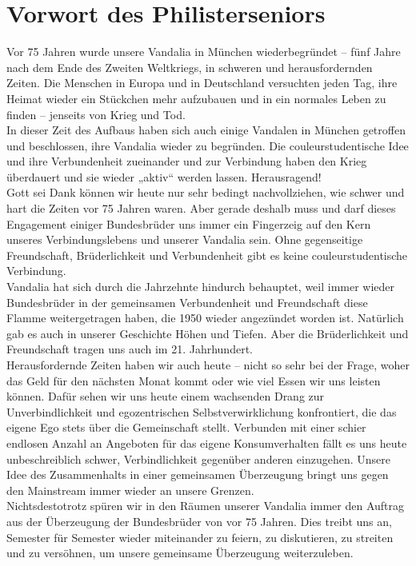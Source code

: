 \section{Vorwort des Philisterseniors}


\begin{multicols}{2}

Vor 75 Jahren wurde unsere Vandalia in München
wiederbegründet – fünf Jahre nach dem Ende des Zweiten Weltkriegs, in schweren
und herausfordernden Zeiten. Die Menschen in Europa und in Deutschland
versuchten jeden Tag, ihre Heimat wieder ein Stückchen mehr aufzubauen und in
ein normales Leben zu finden – jenseits von Krieg und Tod.\\
In dieser Zeit des Aufbaus haben sich auch einige Vandalen
in München getroffen und beschlossen, ihre Vandalia wieder zu begründen. Die
couleurstudentische Idee und ihre Verbundenheit zueinander und zur Verbindung
haben den Krieg überdauert und sie wieder „aktiv“ werden lassen. \newline Herausragend!\\
Gott sei Dank können wir heute nur sehr bedingt
nachvollziehen, wie schwer und hart die Zeiten vor 75 Jahren waren. Aber gerade
deshalb muss und darf dieses Engagement einiger Bundesbrüder uns immer ein
Fingerzeig auf den Kern unseres Verbindungslebens und unserer Vandalia sein.
Ohne gegenseitige Freundschaft, Brüderlichkeit und Verbundenheit gibt es keine
couleurstudentische Verbindung.\\
Vandalia hat sich durch die Jahrzehnte hindurch behauptet,
weil immer wieder Bundesbrüder in der gemeinsamen Verbundenheit und
Freundschaft diese Flamme weitergetragen haben, die 1950 wieder angezündet
worden ist. Natürlich gab es auch in unserer Geschichte Höhen und Tiefen. Aber
die Brüderlichkeit und Freundschaft tragen uns auch im 21. Jahrhundert.\\
Herausfordernde Zeiten haben wir auch heute – nicht so sehr
bei der Frage, woher das Geld für den nächsten Monat kommt oder wie viel Essen
wir uns leisten können. Dafür sehen wir uns heute einem wachsenden Drang zur
Unverbindlichkeit und egozentrischen Selbstverwirklichung konfrontiert, die das
eigene Ego stets über die Gemeinschaft stellt. Verbunden mit einer schier
endlosen Anzahl an Angeboten für das eigene Konsumverhalten fällt es uns heute
unbeschreiblich schwer, Verbindlichkeit gegenüber anderen einzugehen. Unsere
Idee des Zusammenhalts in einer gemeinsamen Überzeugung bringt uns gegen den
Mainstream immer wieder an unsere Grenzen.\\
Nichtsdestotrotz spüren wir in den Räumen unserer Vandalia
immer den Auftrag aus der Überzeugung der Bundesbrüder von vor 75 Jahren. Dies
treibt uns an, Semester für Semester wieder miteinander zu feiern, zu
diskutieren, zu streiten und zu versöhnen, um unsere gemeinsame Überzeugung
weiterzuleben.


\end{multicols}
